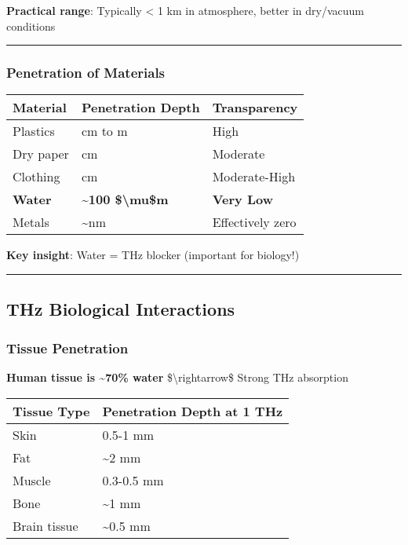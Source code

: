 \textbf{Practical range}: Typically \textless{} 1 km in atmosphere,
better in dry/vacuum conditions

\begin{center}\rule{0.5\linewidth}{0.5pt}\end{center}

\subsubsection{Penetration of Materials}\label{penetration-of-materials}

{\def\LTcaptype{} %
\begin{longtable}[]{@{}lll@{}}
\toprule\noalign{}
Material & Penetration Depth & Transparency \\
\midrule\noalign{}
\endhead
\bottomrule\noalign{}
\endlastfoot
Plastics & cm to m & High \\
Dry paper & cm & Moderate \\
Clothing & cm & Moderate-High \\
\textbf{Water} & \textbf{\textasciitilde100 \$\textbackslash mu\$m} &
\textbf{Very Low} \\
Metals & \textasciitilde nm & Effectively zero \\
\end{longtable}
}

\textbf{Key insight}: Water = THz blocker (important for biology!)

\begin{center}\rule{0.5\linewidth}{0.5pt}\end{center}

\subsection{THz Biological
Interactions}\label{thz-biological-interactions}

\subsubsection{Tissue Penetration}\label{tissue-penetration}

\textbf{Human tissue is \textasciitilde70\% water}
\$\textbackslash rightarrow\$ Strong THz absorption

{\def\LTcaptype{} %
\begin{longtable}[]{@{}ll@{}}
\toprule\noalign{}
Tissue Type & Penetration Depth at 1 THz \\
\midrule\noalign{}
\endhead
\bottomrule\noalign{}
\endlastfoot
Skin & 0.5-1 mm \\
Fat & \textasciitilde2 mm \\
Muscle & 0.3-0.5 mm \\
Bone & \textasciitilde1 mm \\
Brain tissue & \textasciitilde0.5 mm \\
\end{longtable}
}

